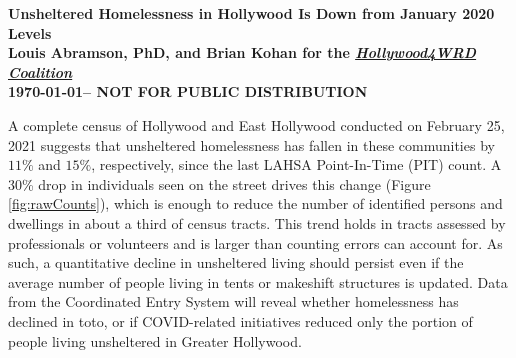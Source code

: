 \documentclass[11pt]{article}
\def\bfr{\bf\color{red}}
\def\resp{respectively}
\begin{document}

\begin{center}
	\Large\bf Unsheltered Homelessness in Hollywood Is Down from January 2020 Levels\\
	\vspace{1ex}
	{\normalsize\rm Louis Abramson, PhD, and Brian Kohan 
	for the \href{http://www.hollywood4wrd.live}{\it Hollywood4WRD Coalition} \\ \today -- {\bfr NOT FOR PUBLIC DISTRIBUTION}}


\end{center}

 A complete census of Hollywood and East Hollywood conducted on February 25, 2021 
suggests that unsheltered homelessness has fallen in these communities by $11\%$ and $15\%$, \resp, since the 
last LAHSA Point-In-Time (PIT) count. A 30\% drop in individuals seen on the street drives this 
change (Figure \ref{fig:rawCounts}), which is enough to reduce the number of identified persons and dwellings in 
about a third of census tracts. This trend holds in tracts assessed by professionals or volunteers and is larger 
than counting errors can account for. As such, a quantitative decline in unsheltered living should persist 
even if the average number of people living in tents or makeshift structures is updated. Data from the Coordinated 
Entry System will reveal whether homelessness has declined in toto, or if COVID-related initiatives reduced only 
the portion of people living unsheltered in Greater Hollywood.
\end{document}
